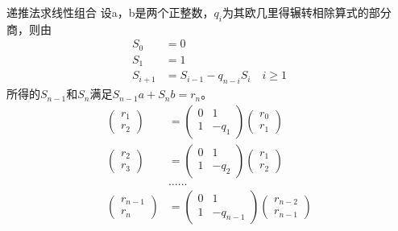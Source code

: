 \documentclass[cn,10pt]{elegantbook}
\begin{document}
\begin{theorem}{递推法求线性组合}
  设a，b是两个正整数，$q_i$为其欧几里得辗转相除算式的部分商，则由
  \begin{align*}
    S_0 &= 0
    \\S_1 &= 1
    \\S_{i+1} &=S_{i-1}-q_{n-i}S_i \quad i \geq 1
  \end{align*}
  所得的$S_{n-1}$和$S_n$满足$S_{n-1}a+S_n b = r_n$。
  \begin{align*}
    \begin{pmatrix}
      r_1\\
      r_2
    \end{pmatrix}& =\begin{pmatrix}
      0 & 1\\
      1 & -q_1
    \end{pmatrix}\begin{pmatrix}
      r_0 \\
      r_1
    \end{pmatrix}\\
    \begin{pmatrix}
      r_2\\
      r_3
    \end{pmatrix}& = \begin{pmatrix}
      0 & 1\\
      1 & -q_2
    \end{pmatrix}\begin{pmatrix}
      r_1\\
      r_2
    \end{pmatrix}\\
    &\dots  \dots \\
    \begin{pmatrix}
      r_{n-1}\\
      r_n
    \end{pmatrix}& = \begin{pmatrix}
      0 & 1\\
      1 & -q_{n-1}
    \end{pmatrix}\begin{pmatrix}
      r_{n-2}\\
      r_{n-1}
    \end{pmatrix}
  \end{align*}
\end{theorem}
\end{document}
